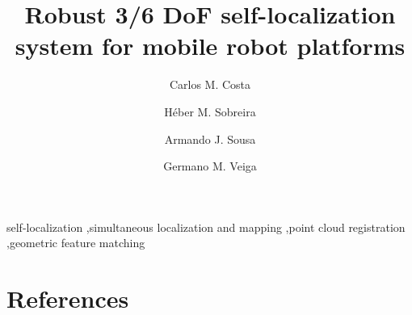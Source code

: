 










\begin{frontmatter}

\title{Robust 3/6 DoF self-localization system for mobile robot platforms}


\author[inesc-address]{Carlos M. Costa}

\author[inesc-address]{Héber M. Sobreira}

\author[inesc-address]{Armando J. Sousa}

\author[inesc-address]{Germano M. Veiga}

\address[inesc-address]{INESC TEC, Rua Dr. Roberto Frias, 4200-465 Porto, Portugal}





\begin{keyword}
self-localization \sep simultaneous localization and mapping \sep point cloud registration \sep geometric feature matching
\end{keyword}

\end{frontmatter}




%






%



\section*{References}






